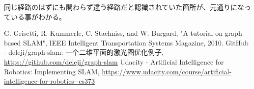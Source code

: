 \documentclass{article}
\begin{document}
同じ経路のはずにも関わらず違う経路だと認識されていた箇所が、元通りになっている事がわかる。

\newpage

\begin{thebibliography}{99}
   G. Grisetti, R. Kummerle, C. Stachniss, and W. Burgard,
    "A tutorial on graph-based SLAM",
    IEEE Intelligent Transportation Systems Magazine,
    2010.
   GitHub - deleji/graph-slam: 一个二维平面的激光图优化例子,
  \url{https://github.com/deleji/graph-slam}
   Udacity - Artificial Intelligence for Robotics: Implementing SLAM,
  \url{https://www.udacity.com/course/artificial-intelligence-for-robotics--cs373}
\end{thebibliography}
\end{document}
